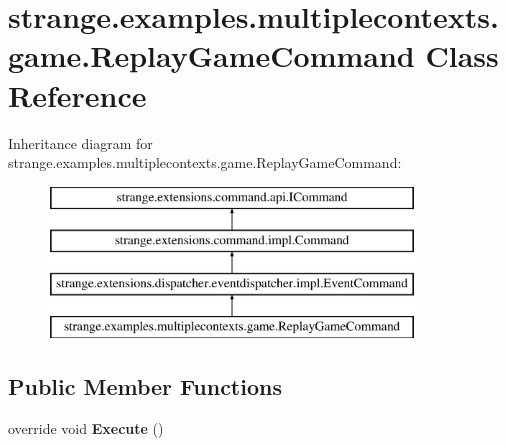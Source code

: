 \hypertarget{classstrange_1_1examples_1_1multiplecontexts_1_1game_1_1_replay_game_command}{\section{strange.\-examples.\-multiplecontexts.\-game.\-Replay\-Game\-Command Class Reference}
\label{classstrange_1_1examples_1_1multiplecontexts_1_1game_1_1_replay_game_command}
}
Inheritance diagram for strange.\-examples.\-multiplecontexts.\-game.\-Replay\-Game\-Command\-:\begin{figure}[H]
\begin{center}
\leavevmode
\includegraphics[height=4.000000cm]{classstrange_1_1examples_1_1multiplecontexts_1_1game_1_1_replay_game_command}
\end{center}
\end{figure}
\subsection*{Public Member Functions}
\begin{DoxyCompactItemize}
\item 
\hypertarget{classstrange_1_1examples_1_1multiplecontexts_1_1game_1_1_replay_game_command_a0d805e085a5ae1ee7df1723d07ba3b6f}{override void {\bfseries Execute} ()}\label{classstrange_1_1examples_1_1multiplecontexts_1_1game_1_1_replay_game_command_a0d805e085a5ae1ee7df1723d07ba3b6f}

\end{DoxyCompactItemize}

